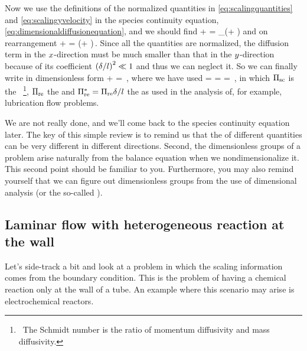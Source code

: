 \begin{enumerate}
Now we use the definitions of the normalized quantities in \cref{eq:scalingquantities} and \cref{eq:scalingyvelocity} in the species continuity equation, \cref{eq:dimensionaldiffusionequation}, and we should find
\beq
\dfrac{\fsvel}{\length}\ndvelx\xpd\ndconc\ndposx + \dfrac{\fsvel\blthck}{\blthck\length}\ndvely\xpd\conc\ndposy =
\kmdiff_\left(\conc\ndposx + \conc\ndposy\right)
\eeq
and on rearrangement
\beq
\ndvelx\xpd\conc\ndposx + \ndvely\xpd\conc\ndposy =
\left(\conc\ndposx + \conc\ndposy\right)\,.
\eeq
Since all the quantities are normalized, the diffusion term in the $x$-direction must be much smaller than that in the $y$-direction because of its coefficient $\left(\delta/l\right)^2\ll 1$ and thus we can neglect it. So we can finally write in dimensionless form
\bneq\label{eq:dimlessspeciescontinuity}
\ndvelx\xpd\conc\ndposx + \ndvely\xpd\conc\ndposy = \conc\ndposy\,,
\eneq
where we have used
\beq
{} = 
\dfrac{\kvisc}{\fsvel\blthck}\dfrac{\length}{\blthck} =
\dfrac{\length}{\blthck} = 
\,,
\eeq
in which $\Pi_\text{sc}$ is the ~\footnote{~The Schmidt number is the ratio of momentum diffusivity and mass diffusivity.}, $\Pi_\text{re}$ the  and $\Pi^*_\text{re} = \Pi_\text{re}\delta/l$ the  as used in the analysis of, for example, lubrication flow problems.
\end{enumerate}

We are not really done, and we'll come back to the species continuity equation later. The key of this simple review is to remind us that the  of different quantities can be very different in different directions. Second, the dimensionless groups of a problem arise naturally from the balance equation when we nondimensionalize it. This second point should be familiar to you. Furthermore, you may also remind yourself that we can figure out dimensionless groups from the use of dimensional analysis (or the so-called ).


\subsection{Laminar flow with heterogeneous reaction at the wall}
Let's side-track a bit and look at a problem in which the scaling information comes from the boundary condition. This is the problem of having a chemical reaction only at the wall of a tube. An example where this scenario may arise is electrochemical reactors.

